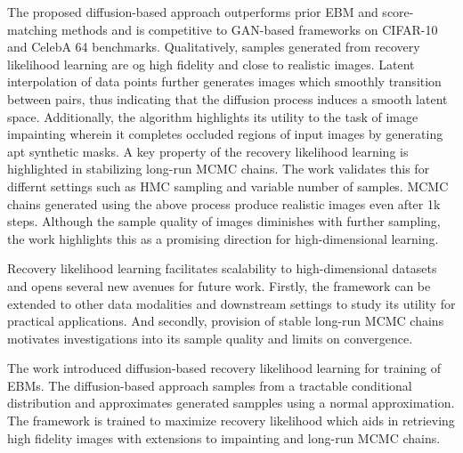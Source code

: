 \documentclass[11pt,letterpaper]{article}
\begin{document}
The proposed diffusion-based approach outperforms prior EBM and score-matching methods and is competitive to GAN-based frameworks on CIFAR-10 and CelebA 64 benchmarks. Qualitatively, samples generated from recovery likelihood learning are og high fidelity and close to realistic images. Latent interpolation of data points further generates images which smoothly transition between pairs, thus indicating that the diffusion process induces a smooth latent space. Additionally, the algorithm highlights its utility to the task of image impainting wherein it completes occluded regions of input images by generating apt synthetic masks. A key property of the recovery likelihood learning is highlighted in stabilizing long-run MCMC chains. The work validates this for differnt settings such as HMC sampling and variable number of samples. MCMC chains generated using the above process produce realistic images even after 1k steps. Although the sample quality of images diminishes with further sampling, the work highlights this as a promising direction for high-dimensional learning. 

Recovery likelihood learning facilitates scalability to high-dimensional datasets and opens several new avenues for future work. Firstly, the framework can be extended to other data modalities and downstream settings to study its utility for practical applications. And secondly, provision of stable long-run MCMC chains motivates investigations into its sample quality and limits on convergence.

The work introduced diffusion-based recovery likelihood learning for training of EBMs. The diffusion-based approach samples from a tractable conditional distribution and approximates generated sampples using a normal approximation. The framework is trained to maximize recovery likelihood which aids in retrieving high fidelity images with extensions to impainting and long-run MCMC chains.
\end{document}
